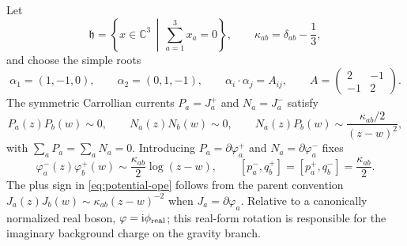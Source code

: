 \documentclass[11pt,a4paper]{article}
\numberwithin{equation}{section}
\theoremstyle{remark}
\newcommand{\ii}{\mathrm{i}}
\begin{document}
Let
\begin{equation}
 \mathfrak h=\left\{x\in\mathbb C^3\,\middle|\,\sum_{a=1}^3x_a=0\right\},
 \qquad \kappa_{ab}=\delta_{ab}-\frac13,
 \label{eq:kappa}
\end{equation}
and choose the simple roots
\begin{equation}
 \alpha_1=(1,-1,0),\qquad \alpha_2=(0,1,-1),\qquad
 \alpha_i\!\cdot\alpha_j=A_{ij},\qquad
 A=\begin{pmatrix}2&-1\\-1&2\end{pmatrix}.
 \label{eq:roots}
\end{equation}
The symmetric Carrollian currents $P_a=J_a^+$ and $N_a=J_a^-$ satisfy
\begin{equation}
 P_a(z)P_b(w)\sim0,\qquad N_a(z)N_b(w)\sim0,\qquad
 N_a(z)P_b(w)\sim\frac{\kappa_{ab}/2}{(z-w)^2},
 \label{eq:crossed-heisenberg}
\end{equation}
with $\sum_aP_a=\sum_aN_a=0$.  Introducing $P_a=\partial\varphi_a^+$ and
$N_a=\partial\varphi_a^-$ fixes
\begin{equation}
 \varphi_a^-(z)\varphi_b^+(w)\sim \frac{\kappa_{ab}}2\log(z-w),
 \qquad
 [p_a^-,q_b^+]=[p_a^+,q_b^-]=\frac{\kappa_{ab}}2.
 \label{eq:potential-ope}
\end{equation}
The plus sign in \cref{eq:potential-ope} follows from the parent convention
$J_a(z)J_b(w)\sim\kappa_{ab}(z-w)^{-2}$ when $J_a=\partial\varphi_a$.  Relative to a
canonically normalized real boson, $\varphi=\ii\phi_{\rm real}$; this real-form rotation is
responsible for the imaginary background charge on the gravity branch.
\end{document}
